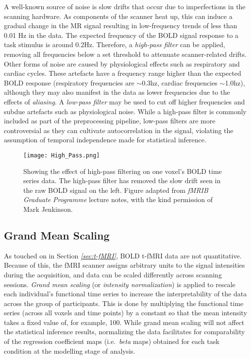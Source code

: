 A well-known source of noise is slow drifts that occur due to imperfections in the scanning hardware. As components of the scanner heat up, this can induce a gradual change in the MR signal resulting in low-frequency trends of less than 0.01 Hz in the data. The expected frequency of the BOLD signal response to a task stimulus is around 0.2Hz. Therefore, a \textit{high-pass filter} can be applied, removing all frequencies below a set threshold to attenuate scanner-related drifts. Other forms of noise are caused by physiological effects such as respiratory and cardiac cycles. These artefacts have a frequency range higher than the expected BOLD response (respiratory frequencies are $\sim$0.3hz, cardiac frequencies $\sim$1.0hz), although they may also manifest in the data as lower frequencies due to the effects of \textit{aliasing}. A \textit{low-pass filter} may be used to cut off higher frequencies and subdue artefacts such as physiological noise. While a high-pass filter is commonly included as part of the preprocessing pipeline, low-pass filters are more controversial as they can cultivate autocorrelation in the signal, violating the assumption of temporal independence made for statistical inference. 

\begin{figure}[!ht]
\centering
	\texttt{[image: High\_Pass.png]}
\caption{Showing the effect of high-pass filtering on one voxel's BOLD time series data. The high-pass filter has removed the slow drift seen in the raw BOLD signal on the left. Figure adapted from \textit{fMRIB Graduate Programme} lecture notes, with the kind permission of Mark Jenkinson.}
\label{fig:High_Pass}
\end{figure}

\subsection{Grand Mean Scaling}

As touched on in Section \textit{\ref{sec:t-fMRI}}, BOLD t-fMRI data are not quantitative. Because of this, the fMRI scanner assigns arbitrary units to the signal intensities during the acquisition, and data can be scaled differently across scanning sessions. \textit{Grand mean scaling} (or \textit{intensity normalization}) is applied to rescale each individual's functional time series to increase the interpretability of the data across the group of participants. This is done by multiplying the functional time series (across all voxels and time points) by a constant so that the mean intensity takes a fixed value of, for example, 100. While grand mean scaling will not affect the statistical inference results, normalizing the data facilitates for comparability of the regression coefficient maps (i.e.\ \textit{beta} maps) obtained for each task condition at the modelling stage of analysis.  

